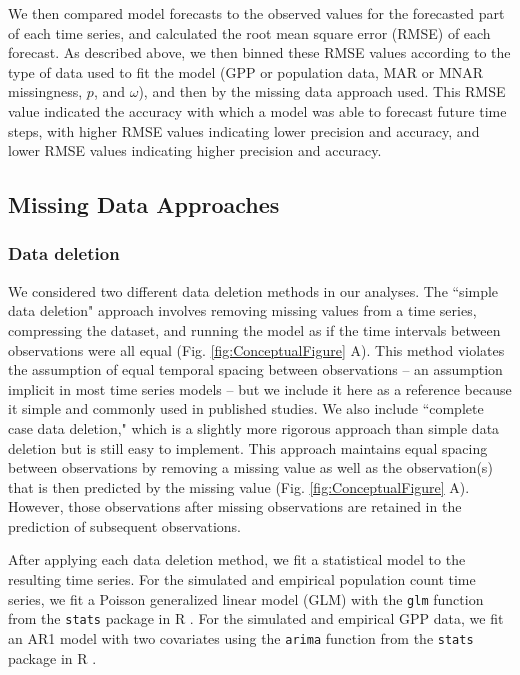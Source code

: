 \documentclass{article}
\begin{document}
\begin{linenumbers}
We then compared model forecasts to the observed values for the forecasted part of each time series, and calculated the root mean square error (RMSE) of each forecast. As described above, we then binned these RMSE values according to the type of data used to fit the model (GPP or population data, MAR or MNAR missingness, $p$, and $\omega$), and then by the missing data approach used. This RMSE value indicated the accuracy with which a model was able to forecast future time steps, with higher RMSE values indicating lower precision and accuracy, and lower RMSE values indicating higher precision and accuracy.     


\subsection*{Missing Data Approaches}

\subsubsection*{Data deletion}
We considered two different data deletion methods in our analyses. The ``simple data deletion" approach involves removing missing values from a time series, compressing the dataset, and running the model as if the time intervals between observations were all equal (Fig. \ref{fig:ConceptualFigure} A). This method violates the assumption of equal temporal spacing between observations -- an assumption implicit in most time series models -- but we include it here as a reference because it simple and commonly used in published studies. We also include ``complete case data deletion," which is a slightly more rigorous approach than simple data deletion but is still easy to implement. This approach maintains equal spacing between observations by removing a missing value as well as the observation(s) that is then predicted by the missing value (Fig. \ref{fig:ConceptualFigure} A). However, those observations after missing observations are retained in the prediction of subsequent observations. 

After applying each data deletion method, we fit a statistical model to the resulting time series. For the simulated and empirical population count time series, we fit a Poisson generalized linear model (GLM) with the \texttt{glm} function from the \texttt{stats} package in R \citep{r_2021}. For the simulated and empirical GPP data, we fit an AR1 model with two covariates using the \texttt{arima} function from the \texttt{stats} package in R \citep{r_2021}. 



\end{linenumbers}
\end{document}
